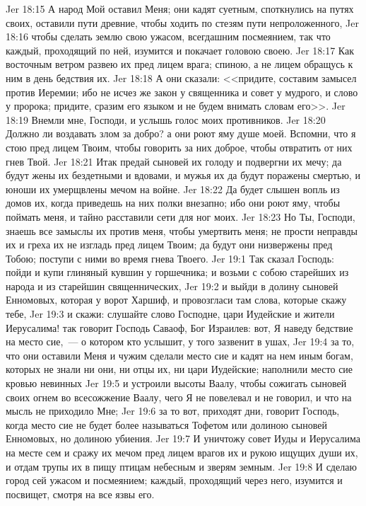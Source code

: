 \vs Jer 18:15 А народ Мой оставил Меня; они кадят суетным, споткнулись на путях своих, оставили пути древние, чтобы ходить по стезям пути непроложенного,
\vs Jer 18:16 чтобы сделать землю свою ужасом, всегдашним посмеянием, так что каждый, проходящий по ней, изумится и покачает головою своею.
\vs Jer 18:17 Как восточным ветром развею их пред лицем врага; спиною, а не лицем обращусь к ним в день бедствия их.
\vs Jer 18:18 А они сказали: <<придите, составим замысел против Иеремии; ибо не исчез же закон у священника и совет у мудрого, и слово у пророка; придите, сразим его языком и не будем внимать словам его>>.
\vs Jer 18:19 Внемли мне, Господи, и услышь голос моих противников.
\vs Jer 18:20 Должно ли воздавать злом за добро? а они роют яму душе моей. Вспомни, что я стою пред лицем Твоим, чтобы говорить за них доброе, чтобы отвратить от них гнев Твой.
\vs Jer 18:21 Итак предай сыновей их голоду и подвергни их мечу; да будут жены их бездетными и вдовами, и мужья их да будут поражены смертью, и юноши их умерщвлены мечом на войне.
\vs Jer 18:22 Да будет слышен вопль из домов их, когда приведешь на них полки внезапно; ибо они роют яму, чтобы поймать меня, и тайно расставили сети для ног моих.
\vs Jer 18:23 Но Ты, Господи, знаешь все замыслы их против меня, чтобы умертвить меня; не прости неправды их и греха их не изгладь пред лицем Твоим; да будут они низвержены пред Тобою; поступи с ними во время гнева Твоего.
\vs Jer 19:1 Так сказал Господь: пойди и купи глиняный кувшин у горшечника; и возьми с собою старейших из народа и из старейшин священнических,
\vs Jer 19:2 и выйди в долину сыновей Енномовых, которая у ворот Харшиф, и провозгласи там слова, которые скажу тебе,
\vs Jer 19:3 и скажи: слушайте слово Господне, цари Иудейские и жители Иерусалима! так говорит Господь Саваоф, Бог Израилев: вот, Я наведу бедствие на место сие,~--- о котором кто услышит, у того зазвенит в ушах,
\vs Jer 19:4 за то, что они оставили Меня и чужим сделали место сие и кадят на нем иным богам, которых не знали ни они, ни отцы их, ни цари Иудейские; наполнили место сие кровью невинных
\vs Jer 19:5 и устроили высоты Ваалу, чтобы сожигать сыновей своих огнем во всесожжение Ваалу, чего Я не повелевал и не говорил, и что на мысль не приходило Мне;
\vs Jer 19:6 за то вот, приходят дни, говорит Господь, когда место сие не будет более называться Тофетом или долиною сыновей Енномовых, но долиною убиения.
\vs Jer 19:7 И уничтожу совет Иуды и Иерусалима на месте сем и сражу их мечом пред лицем врагов их и рукою ищущих души их, и отдам трупы их в пищу птицам небесным и зверям земным.
\vs Jer 19:8 И сделаю город сей ужасом и посмеянием; каждый, проходящий через него, изумится и посвищет, смотря на все язвы его.
